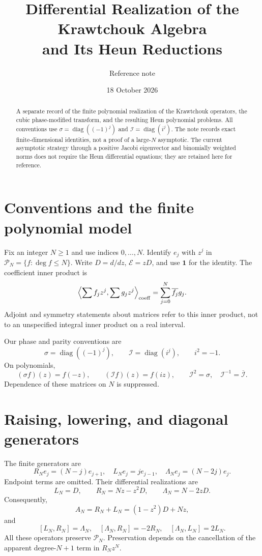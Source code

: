 \documentclass[11pt]{article}
\title{Differential Realization of the Krawtchouk Algebra\\and Its Heun Reductions}
\author{Reference note}
\date{18 October 2026}
\DeclareMathOperator{\diag}{diag}
\newcommand{\Id}{\mathbf 1}
\newcommand{\cI}{\mathcal I}
\newcommand{\Poly}{\mathcal P}
\begin{document}
\maketitle
\begin{abstract}
A separate record of the finite polynomial realization of the Krawtchouk
operators, the cubic phase-modified transform, and the resulting Heun
polynomial problems. All conventions use
$\sigma=\diag((-1)^j)$ and $\mathcal I=\diag(i^j)$.
The note records exact finite-dimensional identities, not a proof of a
large-$N$ asymptotic. The current asymptotic strategy through a positive
Jacobi eigenvector and binomially weighted norms does not require the
Heun differential equations; they are retained here for reference.
\end{abstract}
\tableofcontents

\section{Conventions and the finite polynomial model}
Fix an integer $N\geq 1$ and use indices $0,\ldots,N$. Identify
$e_j$ with $z^j$ in $\Poly_N=\{f:\deg f\leq N\}$.
Write $D=d/dz$, $\mathcal E=zD$, and use $\Id$ for the identity.
The coefficient inner product is
\[
 \left\langle\sum f_jz^j,\sum g_jz^j\right\rangle_{\rm coeff}
 =\sum_{j=0}^N\overline{f_j}g_j.
\]
Adjoint and symmetry statements about matrices refer to this inner
product, not to an unspecified integral inner product on a real interval.

Our phase and parity conventions are
\begin{equation}\label{eq:phases}
 \sigma=\diag((-1)^j),\qquad \cI=\diag(i^j),\qquad i^2=-1.
\end{equation}
On polynomials,
\[
 (\sigma f)(z)=f(-z),\qquad (\cI f)(z)=f(iz),\qquad
 \cI^2=\sigma,\quad \cI^{-1}=\overline{\cI}.
\]
Dependence of these matrices on $N$ is suppressed.

\section{Raising, lowering, and diagonal generators}
The finite generators are
\[
 R_Ne_j=(N-j)e_{j+1},\quad L_Ne_j=je_{j-1},\quad
 \Lambda_Ne_j=(N-2j)e_j.
\]
Endpoint terms are omitted. Their differential realizations are
\begin{equation}\label{eq:generators}
 L_N=D,\qquad R_N=Nz-z^2D,\qquad \Lambda_N=N-2zD.
\end{equation}
Consequently,
\[
 A_N=R_N+L_N=(1-z^2)D+Nz,
\]
and
\[
 [L_N,R_N]=\Lambda_N,\quad
 [\Lambda_N,R_N]=-2R_N,\quad
 [\Lambda_N,L_N]=2L_N.
\]
All these operators preserve $\Poly_N$. Preservation depends on the
cancellation of the apparent degree-$N+1$ term in $R_Nz^N$.
\end{document}
